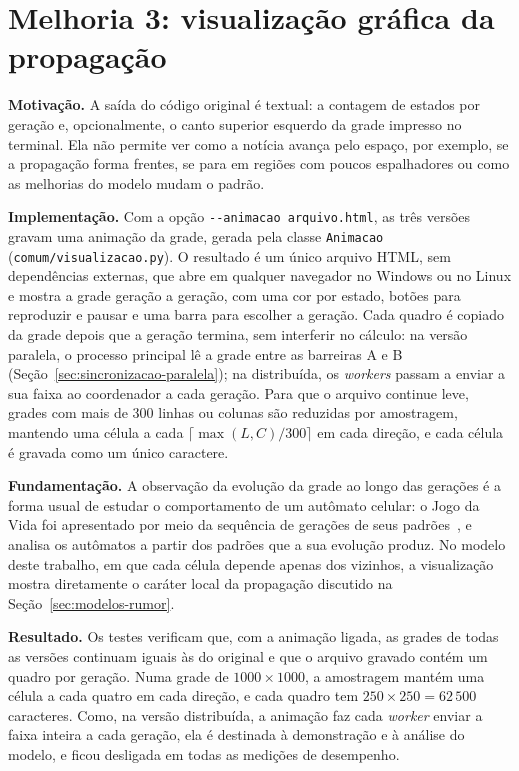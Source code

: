 \section{Melhoria 3: visualização gráfica da propagação}\label{sec:melhoria-visualizacao}

\textbf{Motivação.} A saída do código original é textual: a contagem de estados por geração e, opcionalmente, o canto superior esquerdo da grade impresso no terminal. Ela não permite ver como a notícia avança pelo espaço, por exemplo, se a propagação forma frentes, se para em regiões com poucos espalhadores ou como as melhorias do modelo mudam o padrão.

\textbf{Implementação.} Com a opção \texttt{-{}-animacao arquivo.html}, as três versões gravam uma animação da grade, gerada pela classe \texttt{Animacao} (\texttt{comum/visualizacao.py}). O resultado é um único arquivo HTML, sem dependências externas, que abre em qualquer navegador no Windows ou no Linux e mostra a grade geração a geração, com uma cor por estado, botões para reproduzir e pausar e uma barra para escolher a geração. Cada quadro é copiado da grade depois que a geração termina, sem interferir no cálculo: na versão paralela, o processo principal lê a grade entre as barreiras A e B (Seção~\ref{sec:sincronizacao-paralela}); na distribuída, os \textit{workers} passam a enviar a sua faixa ao coordenador a cada geração. Para que o arquivo continue leve, grades com mais de 300 linhas ou colunas são reduzidas por amostragem, mantendo uma célula a cada $\lceil \max(L, C)/300 \rceil$ em cada direção, e cada célula é gravada como um único caractere.

\textbf{Fundamentação.} A observação da evolução da grade ao longo das gerações é a forma usual de estudar o comportamento de um autômato celular: o Jogo da Vida foi apresentado por meio da sequência de gerações de seus padrões~\cite{Gardner1970}, e  analisa os autômatos a partir dos padrões que a sua evolução produz. No modelo deste trabalho, em que cada célula depende apenas dos vizinhos, a visualização mostra diretamente o caráter local da propagação discutido na Seção~\ref{sec:modelos-rumor}.

\textbf{Resultado.} Os testes verificam que, com a animação ligada, as grades de todas as versões continuam iguais às do original e que o arquivo gravado contém um quadro por geração. Numa grade de $1000 \times 1000$, a amostragem mantém uma célula a cada quatro em cada direção, e cada quadro tem $250 \times 250 = 62\,500$ caracteres. Como, na versão distribuída, a animação faz cada \textit{worker} enviar a faixa inteira a cada geração, ela é destinada à demonstração e à análise do modelo, e ficou desligada em todas as medições de desempenho.

